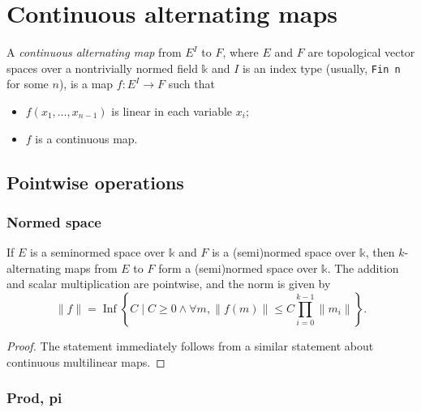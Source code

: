 \chapter{Continuous alternating maps}

\begin{definition}%
  \label{def:cont-alt-map}
  \leanok%
  A \emph{continuous alternating map} from \(E^{I}\) to \(F\),
  where \(E\) and \(F\) are topological vector spaces
  over a nontrivially normed field \(\mathbb k\)
  and \(I\) is an index type (usually, \texttt{Fin n} for some \(n\)),
  is a map \(f\colon E^{I} \to F\) such that
  \begin{itemize}
  \item \(f(x_{1}, \dots, x_{n - 1})\) is linear in each variable \(x_{i}\);
  \item \(f\) is a continuous map.
  \end{itemize}
\end{definition}

\section{Pointwise operations}%
\label{sec:pointwise-operations}

\subsection{Normed space}%
\label{sec:arithmetic}

\begin{theorem}%
  \label{thm:normed-grp}
  If \(E\) is a seminormed space over \(\mathbb k\) and \(F\) is a (semi)normed space over \(\mathbb k\),
  then \(k\)-alternating maps from \(E\) to \(F\) form a (semi)normed space over \(\mathbb k\).
  The addition and scalar multiplication are pointwise, and the norm is given by
  \begin{equation}
    \label{eq:alt-norm}
    \|f\| = \operatorname{Inf} \left\{C \mid C \ge 0 \wedge \forall m, \|f(m)\| \le C\prod_{i=0}^{k-1}\|m_{i}\|\right\}.
  \end{equation}
\end{theorem}
\begin{proof}
  The statement immediately follows from a similar statement about continuous multilinear maps.
\end{proof}

\subsection{Prod, pi}%
\label{sec:prod-pi}

